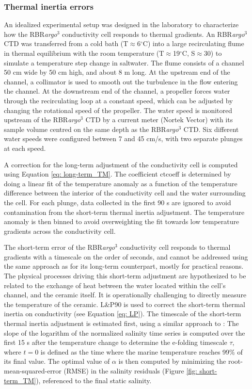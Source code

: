 \documentclass{ametsocV6.1}
\begin{document}
\subsubsection{Thermal inertia errors}
An idealized experimental setup was designed in the laboratory to characterize how the RBR\textit{argo}$^3$ conductivity cell responds to thermal gradients. 
An RBR\textit{argo}$^3$ CTD was transferred from a cold bath (T$\approx$6$^\circ$C) into a large recirculating flume in thermal equilibrium with the room temperature (T$\approx$19$^\circ$C, S$\approx$30) to simulate a temperature step change in saltwater. 
The flume consists of a channel 50 cm wide by 50 cm high, and about 8 m long.  
At the upstream end of the channel, a collimator is used to smooth out the turbulence in the flow entering the channel.
At the downstream end of the channel, a propeller forces water through the recirculating loop at a constant speed, which can be adjusted by changing the rotational speed of the propeller. 
The water speed is monitored upstream of the RBR\textit{argo}$^3$ CTD by a current meter (Nortek Vector) with its sample volume centred on the same depth as the RBR\textit{argo}$^3$ CTD. 
Six different water speeds were configured between 7 and 45 cm/s, with two separate plunges at each speed. 

A correction for the long-term adjustment of the conductivity cell is computed using Equation \ref{eq: long-term_TM}.  
The coefficient ctcoeff is determined by doing a linear fit of the temperature anomaly as a function of the temperature difference between the interior of the conductivity cell and the water surrounding the cell.
For each plunge, data collected in the first 90 s are ignored to avoid contamination from the short-term thermal inertia adjustment. 
The temperature anomaly is then binned to avoid overweighting the fit towards low temperature gradients across the conductivity cell. 

The short-term error of the RBR\textit{argo}$^3$ conductivity cell responds to thermal gradients with a timescale on the order of seconds, and cannot be addressed using the same approach as for its long-term counterpart, mostly for practical reasons. 
The physical processes driving this short-term adjustment are hypothesized to be related to the exchange of heat between the water located within the cell's channel, and the ceramic itself. 
It is operationally challenging to directly measure the temperature of the ceramic. 
L\&P90 is used to correct the short-term thermal inertia on conductivity (see Equation \ref{eq: LP}).  
The timescale of the short-term thermal inertia adjustment is estimated first, using a similar approach to \cite{Lueck_1990b}: The slope of the logarithm of the normalized salinity time series is computed over the first 15 s after the temperature change to determine the e-folding timescale $\tau$, where $t = 0$ is defined as the time where the marine temperature reaches 99\% of its final value.
The optimal value of $\alpha$ is then computed by minimizing the root-mean-squared-error (RMSE) in the salinity residuals (Figure \ref{fig: short-term_TM}), referenced to the final static salinity. 
\end{document}

